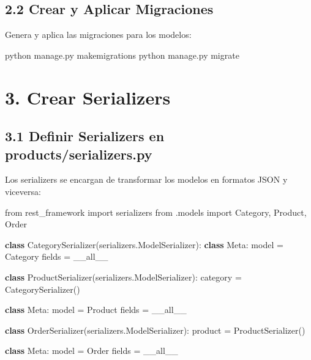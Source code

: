\documentclass[
  a4paper,
  DIV=11,
  numbers=noendperiod,
  onepage,
  openany]{scrreprt}
\newenvironment{Shaded}{\begin{snugshade}}{\end{snugshade}}
\newcommand{\ExtensionTok}[1]{\textcolor[rgb]{0.00,0.23,0.31}{#1}}
\newcommand{\ImportTok}[1]{\textcolor[rgb]{0.00,0.46,0.62}{#1}}
\newcommand{\KeywordTok}[1]{\textcolor[rgb]{0.00,0.23,0.31}{\textbf{#1}}}
\newcommand{\NormalTok}[1]{\textcolor[rgb]{0.00,0.23,0.31}{#1}}
\newcommand{\OperatorTok}[1]{\textcolor[rgb]{0.37,0.37,0.37}{#1}}
\newcommand{\StringTok}[1]{\textcolor[rgb]{0.13,0.47,0.30}{#1}}
\begin{document}
\subsection{2.2 Crear y Aplicar
Migraciones}\label{crear-y-aplicar-migraciones}

Genera y aplica las migraciones para los modelos:

\begin{Shaded}
\begin{Highlighting}[]
\ExtensionTok{python}\NormalTok{ manage.py makemigrations}
\ExtensionTok{python}\NormalTok{ manage.py migrate}
\end{Highlighting}
\end{Shaded}

\section{3. Crear Serializers}\label{crear-serializers}

\subsection{3.1 Definir Serializers en
products/serializers.py}\label{definir-serializers-en-productsserializers.py}

Los serializers se encargan de transformar los modelos en formatos JSON
y viceversa:

\begin{Shaded}
\begin{Highlighting}[]
\ImportTok{from}\NormalTok{ rest\_framework }\ImportTok{import}\NormalTok{ serializers}
\ImportTok{from}\NormalTok{ .models }\ImportTok{import}\NormalTok{ Category, Product, Order}

\KeywordTok{class}\NormalTok{ CategorySerializer(serializers.ModelSerializer):}
    \KeywordTok{class}\NormalTok{ Meta:}
\NormalTok{        model }\OperatorTok{=}\NormalTok{ Category}
\NormalTok{        fields }\OperatorTok{=} \StringTok{\textquotesingle{}\_\_all\_\_\textquotesingle{}}

\KeywordTok{class}\NormalTok{ ProductSerializer(serializers.ModelSerializer):}
\NormalTok{    category }\OperatorTok{=}\NormalTok{ CategorySerializer()}

    \KeywordTok{class}\NormalTok{ Meta:}
\NormalTok{        model }\OperatorTok{=}\NormalTok{ Product}
\NormalTok{        fields }\OperatorTok{=} \StringTok{\textquotesingle{}\_\_all\_\_\textquotesingle{}}

\KeywordTok{class}\NormalTok{ OrderSerializer(serializers.ModelSerializer):}
\NormalTok{    product }\OperatorTok{=}\NormalTok{ ProductSerializer()}

    \KeywordTok{class}\NormalTok{ Meta:}
\NormalTok{        model }\OperatorTok{=}\NormalTok{ Order}
\NormalTok{        fields }\OperatorTok{=} \StringTok{\textquotesingle{}\_\_all\_\_\textquotesingle{}}
\end{Highlighting}
\end{Shaded}
\end{document}
